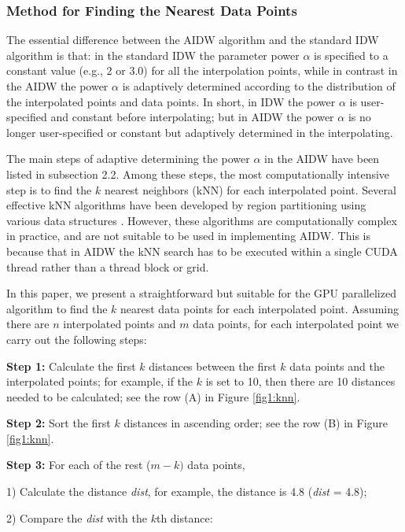 \documentclass[fleqn,11pt]{wlscirep}
\begin{document}
\subsubsection{Method for Finding the Nearest Data Points}

The essential difference between the AIDW algorithm and the standard IDW 
algorithm is that: in the standard IDW the parameter power $\alpha $ is 
specified to a constant value (e.g., 2 or 3.0) for all the interpolation 
points, while in contrast in the AIDW the power $\alpha $ is adaptively 
determined according to the distribution of the interpolated points and data 
points. In short, in IDW the power $\alpha $ is user-specified and constant 
before interpolating; but in AIDW the power $\alpha $ is no longer 
user-specified or constant but adaptively determined in the interpolating. 

The main steps of adaptive determining the power $\alpha $ in the AIDW have 
been listed in subsection 2.2. Among these steps, the most computationally 
intensive step is to find the $k$ nearest neighbors (kNN) for each interpolated 
point. Several effective kNN algorithms have been developed by region 
partitioning using various data structures \cite{20,33,34,35}. However, these 
algorithms are computationally complex in practice, and are not suitable to 
be used in implementing AIDW. This is because that in AIDW the kNN search 
has to be executed within a single CUDA thread rather than a thread block or 
grid. 

In this paper, we present a straightforward but suitable for the GPU 
parallelized algorithm to find the $k$ nearest data points for each 
interpolated point. Assuming there are $n$ interpolated points and $m$ data 
points, for each interpolated point we carry out the following steps:

\textbf{Step 1:} Calculate the first $k$ distances between the first $k$ data points and 
the interpolated points; for example, if the $k$ is set to 10, then there are 
10 distances needed to be calculated; see the row (A) in Figure \ref{fig1:knn}.

\textbf{Step 2:} Sort the first $k$ distances in ascending order; see the row (B) in 
Figure \ref{fig1:knn}.

\textbf{Step 3:} For each of the rest ($m-k)$ data points, 

1) Calculate the distance \textit{dist}, for example, the distance is 4.8 (\textit{dist} = 4.8);

2) Compare the \textit{dist} with the $k$th distance:
\end{document}
